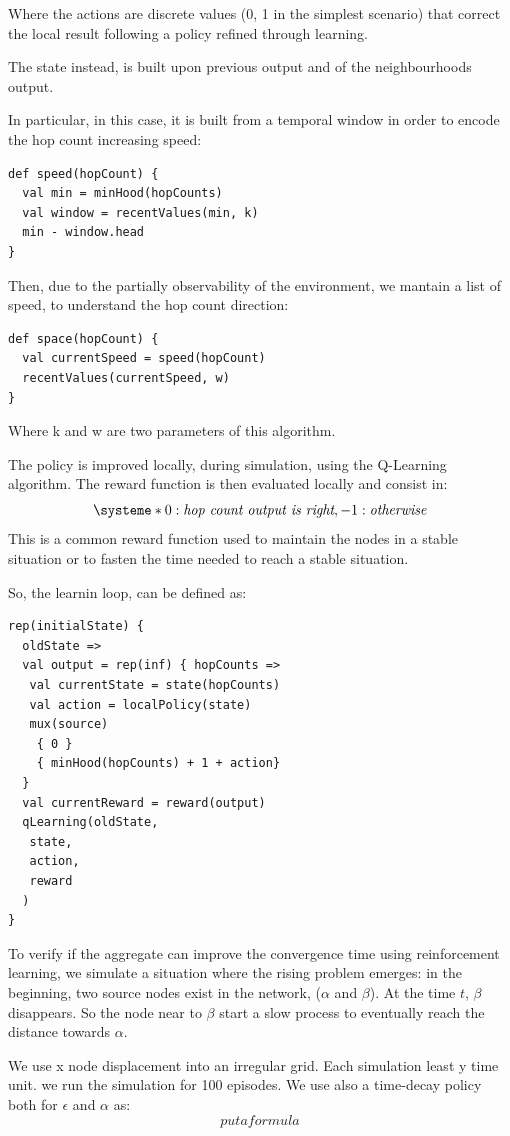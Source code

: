 \documentclass[
  twocolumn,
]{ceurart}
\begin{document}
Where the actions are discrete values (0, 1 in the simplest scenario) that correct the local result following a policy refined through learning.

The state instead, is built upon previous output and of the neighbourhoods output.

In particular, in this case, it is built from a temporal window in order to encode the hop count increasing speed:
\begin{verbatim}
def speed(hopCount) {
  val min = minHood(hopCounts)
  val window = recentValues(min, k)
  min - window.head 
}
\end{verbatim}
Then, due to the partially observability of the environment, we mantain a 
 list of speed, to understand the hop count direction:

 \begin{verbatim}
def space(hopCount) {
  val currentSpeed = speed(hopCount)
  recentValues(currentSpeed, w)
}
\end{verbatim}

Where k and w are two parameters of this algorithm.

The policy is improved locally, during simulation, using the Q-Learning algorithm. 
The reward function is then evaluated locally and consist in: 
\[
\systeme*{0 : \textit{hop count output is right}, -1 : \textit{otherwise}}
\]
This is a common reward function used to maintain the nodes in a stable situation or to
fasten the time needed to reach a stable situation.

So, the learnin loop, can be defined as:
\begin{verbatim}
rep(initialState) {
  oldState =>
  val output = rep(inf) { hopCounts => 
   val currentState = state(hopCounts)
   val action = localPolicy(state)
   mux(source) 
    { 0 } 
    { minHood(hopCounts) + 1 + action} 
  }
  val currentReward = reward(output)
  qLearning(oldState, 
   state, 
   action, 
   reward
  )
}
\end{verbatim}

To verify if the aggregate can improve the convergence time using reinforcement learning,
we simulate a situation where the rising problem emerges:
in the beginning, two source nodes exist in the network, ($\alpha$ and $\beta$).
At the time $t$, $\beta$ disappears. So the node near to $\beta$ start a slow process
to eventually reach the distance towards $\alpha$.

We use x node displacement into an irregular grid. Each simulation least y time unit.
 we run the simulation for 100 episodes.
 We use also a time-decay policy both for $\epsilon$ and $\alpha$ as:
$$
put a formula
$$
\end{document}
